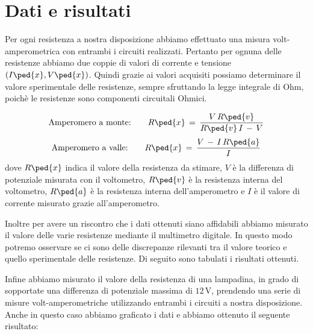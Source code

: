 \section*{Dati e risultati}

Per ogni resistenza a nostra disposizione abbiamo effettuato una misura volt-amperometrica con entrambi i circuiti realizzati. Pertanto per ognuna delle resistenze abbiamo due coppie di valori di corrente e tensione $(I\ped{x}, V\ped{x})$.
Quindi grazie ai valori acquisiti possiamo determinare il valore sperimentale delle resistenze, sempre sfruttando la legge integrale di Ohm, poichè le resistenze sono componenti circuitali Ohmici.

\begin{equation}
	\text{Amperomero a monte:} \qquad R\ped{x} \,=\, \frac{V\,R\ped{v}}{R\ped{v}\,I\,-\,V}
\end{equation}
\begin{equation}
	\text{Amperomero a valle:} \qquad R\ped{x} \,=\, \frac{V\,-\,I\,R\ped{a}}{I}
\end{equation}
%
dove $R\ped{x}$ indica il valore della resistenza da stimare, $V$ è la differenza di potenziale misurata con il voltometro, $R\ped{v}$ è la resistenza interna del voltometro, $R\ped{a}$ è la resistenza interna dell'amperometro e $I$ è il valore di corrente misurato grazie all'amperometro.

Inoltre per avere un riscontro che i dati ottenuti siano affidabili abbiamo misurato il valore delle varie resistenze mediante il multimetro digitale. In questo modo potremo osservare se ci sono delle discrepanze rilevanti tra il valore teorico e quello sperimentale delle resistenze. Di seguito sono tabulati i risultati ottenuti.

Infine abbiamo misurato il valore della resistenza di una lampadina, in grado di sopportate una differenza di potenziale massima di $12\,\si{\volt}$, prendendo una serie di misure volt-amperometriche utilizzando entrambi i circuiti a nostra disposizione.
Anche in questo caso abbiamo graficato i dati e abbiamo ottenuto il seguente risultato:

